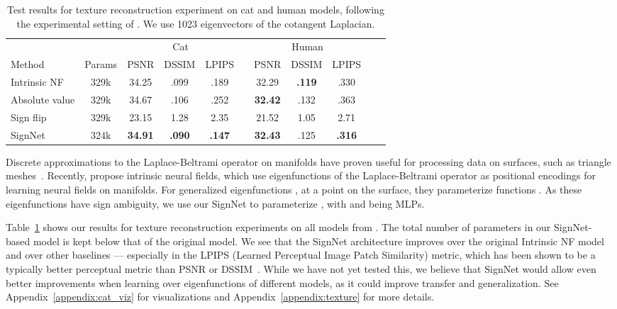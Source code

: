 \documentclass{article} \usepackage{iclr2023_conference,times}
\begin{document}
\begin{table}
    \centering
    \caption{Test results for texture reconstruction experiment on cat and human models, following the experimental setting of \citep{koestler2022intrinsic}. We use 1023 eigenvectors of the cotangent Laplacian.}
    \label{tab:intrinsic_nf}
    {\small
    \begin{tabular}{lcccccccccc}
    \toprule
               & & \multicolumn{3}{c}{Cat} & & \multicolumn{3}{c}{Human}\\
                \cmidrule{3-5}  \cmidrule{7-9}
        Method & Params &  PSNR  & DSSIM  & LPIPS  & &  PSNR  & DSSIM  & LPIPS   \\
        \midrule
         Intrinsic NF & 329k & 34.25 & .099 & .189 & & 32.29 & \textbf{.119} & .330   \\
         Absolute value & 329k & 34.67 & .106 & .252 & & \textbf{32.42} & .132 & .363 \\
         Sign flip & 329k & 23.15 & 1.28 & 2.35 & & 21.52 & 1.05 & 2.71  \\
         SignNet & 324k & \textbf{34.91} & \textbf{.090} & \textbf{.147} & & \textbf{32.43} & .125 & \textbf{.316} \\
         \bottomrule
    \end{tabular}
    }
\end{table}

Discrete approximations to the Laplace-Beltrami operator on manifolds have proven useful for processing data on surfaces, such as triangle meshes~\citep{levy2006laplace}. Recently, \cite{koestler2022intrinsic} propose intrinsic neural fields, which use eigenfunctions of the Laplace-Beltrami operator as positional encodings for learning neural fields on manifolds. For generalized eigenfunctions , at a point  on the surface, they parameterize functions . As these eigenfunctions have sign ambiguity, we use our SignNet to parameterize , with  and  being MLPs.


Table~\ref{tab:intrinsic_nf} shows our results for texture reconstruction experiments on all models from \citet{koestler2022intrinsic}. The total number of parameters in our SignNet-based model is kept below that of the original model. We see that the SignNet architecture improves over the original Intrinsic NF model and over other baselines --- especially in the LPIPS (Learned Perceptual Image Patch Similarity) metric, which has been shown to be a typically better perceptual metric than PSNR or DSSIM~\citep{zhang2018unreasonable}. While we have not yet tested this, we believe that SignNet would allow even better improvements when learning over eigenfunctions of different models, as it could improve transfer and generalization. See Appendix~\ref{appendix:cat_viz} for visualizations and Appendix~\ref{appendix:texture} for more details.
\end{document}
